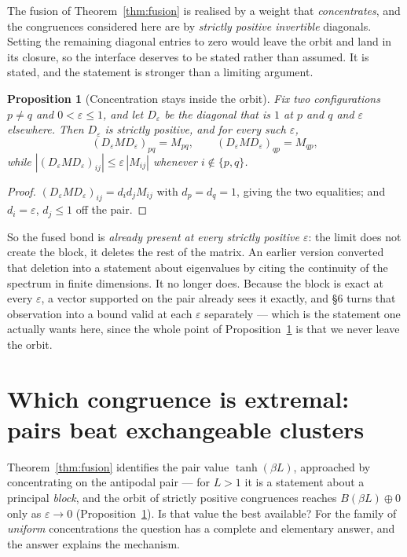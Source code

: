 \documentclass[11pt,a4paper]{article}
\theoremstyle{plain}
\newtheorem{proposition}[theorem]{Proposition}
\theoremstyle{definition}
\begin{document}
The fusion of Theorem~\ref{thm:fusion} is realised by a weight that
\emph{concentrates}, and the congruences considered here are by \emph{strictly
positive invertible} diagonals. Setting the remaining diagonal entries to zero
would leave the orbit and land in its closure, so the interface deserves to be
stated rather than assumed. It is stated, and the statement is stronger than a
limiting argument.

\begin{proposition}[Concentration stays inside the orbit]\label{prop:orbit}
Fix two configurations $p\neq q$ and $0<\varepsilon\le 1$, and let
$D_\varepsilon$ be the diagonal that is $1$ at $p$ and $q$ and $\varepsilon$
elsewhere. Then $D_\varepsilon$ is strictly positive, and for \emph{every} such
$\varepsilon$,
\[
  (D_\varepsilon M D_\varepsilon)_{pq}=M_{pq},
  \qquad
  (D_\varepsilon M D_\varepsilon)_{qp}=M_{qp},
\]
while $|(D_\varepsilon M D_\varepsilon)_{ij}|\le\varepsilon\,|M_{ij}|$ whenever
$i\notin\{p,q\}$.
\end{proposition}

\begin{proof}
$(D_\varepsilon M D_\varepsilon)_{ij}=d_id_jM_{ij}$ with $d_p=d_q=1$, giving the
two equalities; and $d_i=\varepsilon$, $d_j\le1$ off the pair.
\end{proof}

So the fused bond is \emph{already present at every strictly positive
$\varepsilon$}: the limit does not create the block, it deletes the rest of the
matrix. An earlier version converted that deletion into a statement about
eigenvalues by citing the continuity of the spectrum in finite dimensions. It no
longer does. Because the block is exact at every $\varepsilon$, a vector
supported on the pair already sees it exactly, and \S6 turns that observation
into a bound valid at each $\varepsilon$ separately --- which is the statement
one actually wants here, since the whole point of
Proposition~\ref{prop:orbit} is that we never leave the orbit.

\section{Which congruence is extremal: pairs beat exchangeable clusters}

Theorem~\ref{thm:fusion} identifies the pair value $\tanh(\beta L)$, approached
by concentrating on the antipodal pair --- for $L>1$ it is a statement about a
principal \emph{block}, and the orbit of strictly positive congruences reaches
$B(\beta L)\oplus 0$ only as $\varepsilon\to0$
(Proposition~\ref{prop:orbit}). Is that value the best available? For the family
of \emph{uniform} concentrations the question has a complete and elementary
answer, and the answer explains the mechanism.
\end{document}
